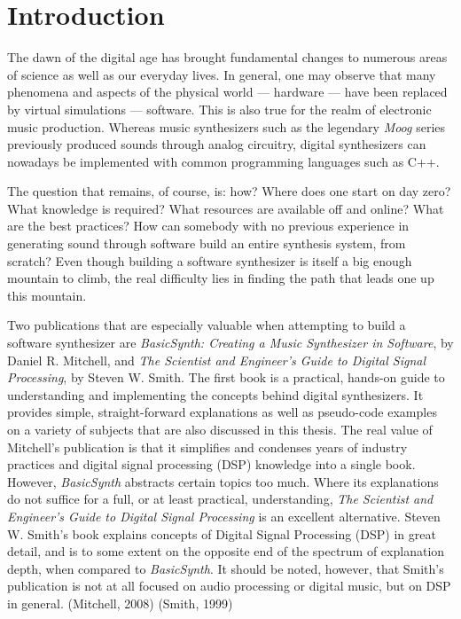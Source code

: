 \chapter*{Introduction}

The dawn of the digital age has brought fundamental changes to numerous areas of science as well as our everyday lives. In general, one may observe that many phenomena and aspects of the physical world --- hardware --- have been replaced by virtual simulations --- software. This is also true for the realm of electronic music production. Whereas music synthesizers such as the legendary \emph{Moog}\footnotemark{} series previously produced sounds through analog circuitry, digital synthesizers can nowadays be implemented with common programming languages such as C++.\parbreak


The question that remains, of course, is: how? Where does one start on day zero? What knowledge is required? What resources are available off and online? What are the best practices? How can somebody with no previous experience in generating sound through software build an entire synthesis system, from scratch? Even though building a software synthesizer is itself a big enough mountain to climb, the real difficulty lies in finding the path that leads one up this mountain. \parbreak

Two publications that are especially valuable when attempting to build a software synthesizer are \emph{BasicSynth: Creating a Music Synthesizer in Software}, by Daniel R. Mitchell, and \emph{The Scientist and Engineer's Guide to Digital Signal Processing}, by Steven W. Smith. The first book is a practical, hands-on guide to understanding and implementing the concepts behind digital synthesizers. It provides simple, straight-forward explanations as well as pseudo-code examples on a variety of subjects that are also discussed in this thesis. The real value of Mitchell's publication is that it simplifies and condenses years of industry practices and digital signal processing (DSP) knowledge into a single book. However, \emph{BasicSynth} abstracts certain topics too much. Where its explanations do not suffice for a full, or at least practical, understanding, \emph{The Scientist and Engineer's Guide to Digital Signal Processing} is an excellent alternative. Steven W. Smith's book explains concepts of Digital Signal Processing (DSP) in great detail, and is to some extent on the opposite end of the spectrum of explanation depth, when compared to \emph{BasicSynth}. It should be noted, however, that Smith's publication is not at all focused on audio processing or digital music, but on DSP in general. (Mitchell, 2008) (Smith, 1999)\parbreak

